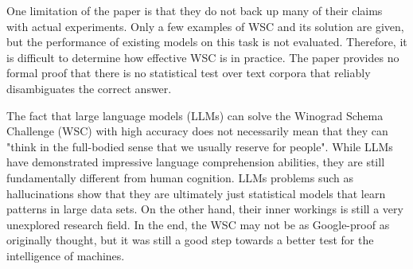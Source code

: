 \documentclass[12pt]{article}
\begin{document}
One limitation of the paper is that they do not back up many of their claims with actual experiments. Only a few examples of WSC and its solution are given, but the performance of existing models on this task is not evaluated. Therefore, it is difficult to determine how effective WSC is in practice. The paper provides no formal proof that there is no statistical test over text corpora that reliably disambiguates the correct answer.

The fact that large language models (LLMs) can solve the Winograd Schema Challenge (WSC) with high accuracy does not necessarily mean that they can "think in the full-bodied sense that we usually reserve for people". While LLMs have demonstrated impressive language comprehension abilities, they are still fundamentally different from human cognition. LLMs problems such as hallucinations show that they are ultimately just statistical models that learn patterns in large data sets. On the other hand, their inner workings is still a very unexplored research field. In the end, the WSC may not be as Google-proof as originally thought, but it was still a good step towards a better test for the intelligence of machines.
\end{document}
